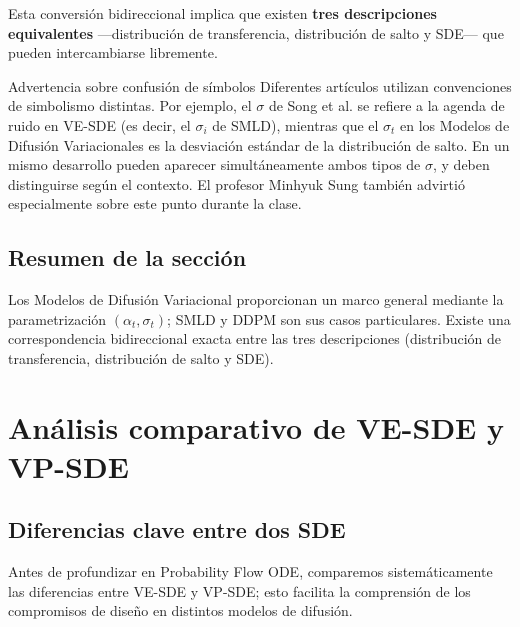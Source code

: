 \documentclass[a4paper]{article}
\begin{document}
Esta conversión bidireccional implica que existen \textbf{tres descripciones equivalentes} —distribución de transferencia, distribución de salto y SDE— que pueden intercambiarse libremente.

\begin{warningbox}{Advertencia sobre confusión de símbolos}
Diferentes artículos utilizan convenciones de simbolismo distintas. Por ejemplo, el $\sigma$ de Song et al. se refiere a la agenda de ruido en VE-SDE (es decir, el $\sigma_i$ de SMLD), mientras que el $\sigma_t$ en los Modelos de Difusión Variacionales es la desviación estándar de la distribución de salto. En un mismo desarrollo pueden aparecer simultáneamente ambos tipos de $\sigma$, y deben distinguirse según el contexto. El profesor Minhyuk Sung también advirtió especialmente sobre este punto durante la clase.
\end{warningbox}

\subsection{Resumen de la sección}

Los Modelos de Difusión Variacional proporcionan un marco general mediante la parametrización $(\alpha_t, \sigma_t)$; SMLD y DDPM son sus casos particulares. Existe una correspondencia bidireccional exacta entre las tres descripciones (distribución de transferencia, distribución de salto y SDE).
\section{Análisis comparativo de VE-SDE y VP-SDE}

\subsection{Diferencias clave entre dos SDE}

Antes de profundizar en Probability Flow ODE, comparemos sistemáticamente las diferencias entre VE-SDE y VP-SDE; esto facilita la comprensión de los compromisos de diseño en distintos modelos de difusión.
\end{document}
